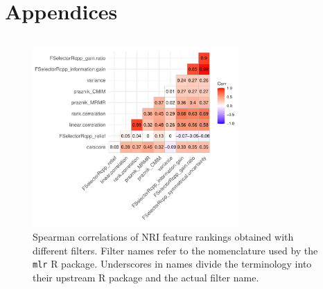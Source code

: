 \documentclass[remotesensing,article,submit,moreauthors,pdftex]{Definitions/mdpi}
\begin{document}
\pagebreak
{} %
\appendixstart
\appendix
\section{Appendices}
\subsection{}

\begin{figure} [ht]
	\begin{center}
		\includegraphics[width=0.7\textwidth] {correlation-filter-nri-1.pdf}
		\caption{Spearman correlations of NRI feature rankings obtained with different filters. Filter names refer to the nomenclature used by the \texttt{mlr} R package. Underscores in names divide the terminology into their upstream R package and the actual filter name.}\label{fig:correlation-filters}
	\end{center}
\end{figure}

\pagebreak

\subsection{}
\end{document}
